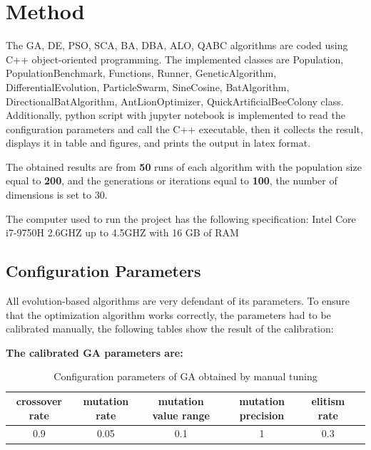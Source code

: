 \documentclass[12pt]{article}
\begin{document}
    
    \section{Method}
    
The GA, DE, PSO, SCA, BA, DBA, ALO, QABC algorithms are coded using C++ object-oriented programming. The implemented classes are Population, PopulationBenchmark,  Functions, Runner, GeneticAlgorithm, DifferentialEvolution, ParticleSwarm, SineCosine, BatAlgorithm, DirectionalBatAlgorithm, AntLionOptimizer, QuickArtificialBeeColony class. Additionally, python script with jupyter notebook is implemented to read the configuration parameters and call the C++ executable, then it collects the result, displays it in table and figures, and prints the output in latex format.
    
    The obtained results are from \textbf{50} runs of each algorithm with the population size equal to \textbf{200}, and the generations or iterations equal to \textbf{100}, the number of dimensions is set to 30.

The computer used to run the project has the following specification: Intel Core i7-9750H 2.6GHZ up to 4.5GHZ with 16 GB of RAM

  
      
\subsection{Configuration Parameters}
All evolution-based algorithms are very defendant of its parameters. To ensure that the optimization algorithm works correctly,  the parameters had to be calibrated manually,
the following tables show the result of the calibration:






\textbf{The calibrated GA parameters are:}
\begin{table}[H]    
\centering
\footnotesize
\begin{tabular}{cccccc}

\hline
crossover rate&    mutation rate&    mutation value range&     mutation precision&     elitism rate\\
\hline

0.9&    0.05&    0.1&    1&    0.3&\\

\hline 
\end{tabular} 

\caption{Configuration parameters of GA obtained by manual tuning} 
\end{table}
\end{document}
